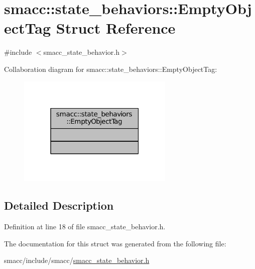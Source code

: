 \hypertarget{structsmacc_1_1state__behaviors_1_1EmptyObjectTag}{}\section{smacc\+:\+:state\+\_\+behaviors\+:\+:Empty\+Object\+Tag Struct Reference}
\label{structsmacc_1_1state__behaviors_1_1EmptyObjectTag}


{\ttfamily \#include $<$smacc\+\_\+state\+\_\+behavior.\+h$>$}



Collaboration diagram for smacc\+:\+:state\+\_\+behaviors\+:\+:Empty\+Object\+Tag\+:
\nopagebreak
\begin{figure}[H]
\begin{center}
\leavevmode
\includegraphics[width=211pt]{structsmacc_1_1state__behaviors_1_1EmptyObjectTag__coll__graph}
\end{center}
\end{figure}


\subsection{Detailed Description}


Definition at line 18 of file smacc\+\_\+state\+\_\+behavior.\+h.



The documentation for this struct was generated from the following file\+:\begin{DoxyCompactItemize}
\item 
smacc/include/smacc/\hyperlink{smacc__state__behavior_8h}{smacc\+\_\+state\+\_\+behavior.\+h}\end{DoxyCompactItemize}
